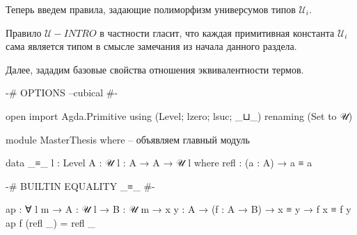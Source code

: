 \documentclass{article}[12pt]
\begin{document}
Теперь введем правила, задающие полиморфизм универсумов типов $\mathcal U_i$.
\begin{multicols}{2}
    \begin{prooftree}
    \end{prooftree}
    \begin{prooftree}
    \end{prooftree}
\end{multicols}
Правило $\mathcal U-INTRO$ в частности гласит, что каждая примитивная константа $\mathcal U_i$ сама является
типом в смысле замечания из начала данного раздела.

Далее, зададим базовые свойства отношения эквивалентности термов.
\begin{multicols}{2}
    \begin{prooftree}
    \end{prooftree}
    \begin{prooftree}
    \end{prooftree}
\end{multicols}
\begin{prooftree}
\end{prooftree}
\begin{multicols}{2}
    \begin{prooftree}
    \end{prooftree}
    \begin{prooftree}
    \end{prooftree}
\end{multicols}

\begin{code}

{-# OPTIONS --cubical #-}

open import Agda.Primitive using (Level; lzero; lsuc; _⊔_)
                           renaming (Set to 𝒰)

module MasterThesis where -- объявляем главный модуль

data _≡_ {l : Level} {A : 𝒰 l} : A → A → 𝒰 l where
    refl : (a : A) → a ≡ a

{-# BUILTIN EQUALITY _≡_  #-}

ap : ∀ {l m} → {A : 𝒰 l} → {B : 𝒰 m} → {x y : A} 
     → (f : A → B) → x ≡ y → f x ≡ f y
ap f (refl _) = refl _

\end{code}
\end{document}
